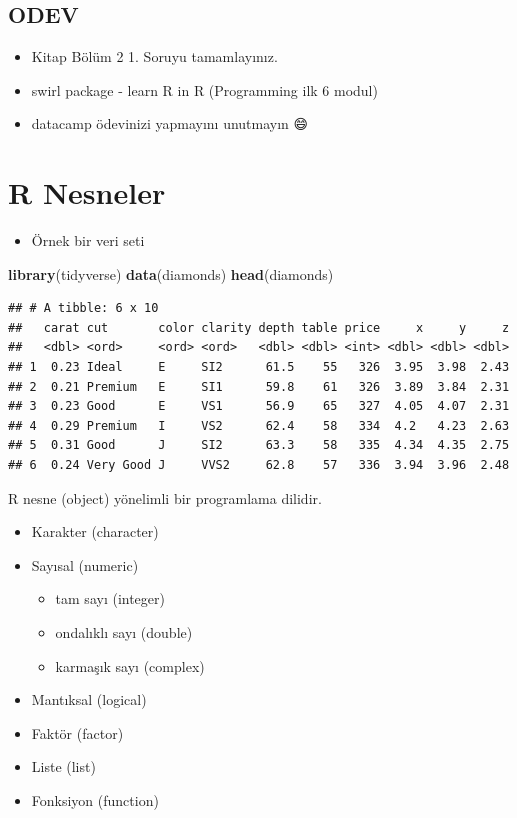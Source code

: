 \documentclass[
  oneside]{book}
\newenvironment{Shaded}{\begin{snugshade}}{\end{snugshade}}
\newcommand{\FunctionTok}[1]{\textcolor[rgb]{0.13,0.29,0.53}{\textbf{#1}}}
\newcommand{\NormalTok}[1]{#1}
\providecommand{\tightlist}{%
  \setlength{\itemsep}{0pt}\setlength{\parskip}{0pt}}
\begin{document}
\hypertarget{odev}{%
\section{\texorpdfstring{\textbf{ODEV}}{ODEV}}\label{odev}}

\begin{itemize}
\item
  Kitap Bölüm 2 1. Soruyu tamamlayınız.
\item
  swirl package - learn R in R (Programming ilk 6 modul)
\item
  datacamp ödevinizi yapmayını unutmayın 😄
\end{itemize}

\hypertarget{r-nesneler}{%
\chapter{R Nesneler}\label{r-nesneler}}

\begin{itemize}
\tightlist
\item
  Örnek bir veri seti
\end{itemize}

\begin{Shaded}
\begin{Highlighting}[]
\FunctionTok{library}\NormalTok{(tidyverse)}
\FunctionTok{data}\NormalTok{(diamonds)}
\FunctionTok{head}\NormalTok{(diamonds)}
\end{Highlighting}
\end{Shaded}

\begin{verbatim}
## # A tibble: 6 x 10
##   carat cut       color clarity depth table price     x     y     z
##   <dbl> <ord>     <ord> <ord>   <dbl> <dbl> <int> <dbl> <dbl> <dbl>
## 1  0.23 Ideal     E     SI2      61.5    55   326  3.95  3.98  2.43
## 2  0.21 Premium   E     SI1      59.8    61   326  3.89  3.84  2.31
## 3  0.23 Good      E     VS1      56.9    65   327  4.05  4.07  2.31
## 4  0.29 Premium   I     VS2      62.4    58   334  4.2   4.23  2.63
## 5  0.31 Good      J     SI2      63.3    58   335  4.34  4.35  2.75
## 6  0.24 Very Good J     VVS2     62.8    57   336  3.94  3.96  2.48
\end{verbatim}

R nesne (object) yönelimli bir programlama dilidir.

\begin{itemize}
\tightlist
\item
  Karakter (character)
\item
  Sayısal (numeric)

  \begin{itemize}
  \tightlist
  \item
    tam sayı (integer)
  \item
    ondalıklı sayı (double)
  \item
    karmaşık sayı (complex)
  \end{itemize}
\item
  Mantıksal (logical)
\item
  Faktör (factor)
\item
  Liste (list)
\item
  Fonksiyon (function)
\end{itemize}
\end{document}
